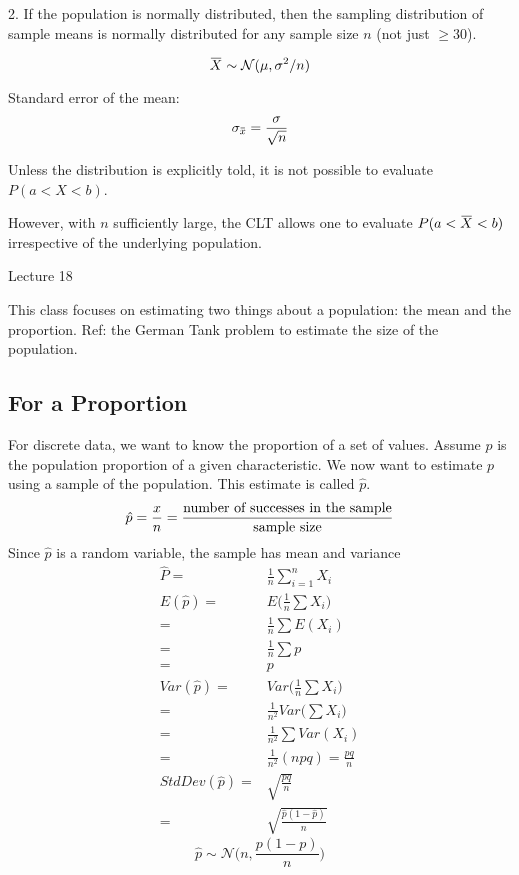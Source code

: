 \documentclass[11pt, oneside]{article}   	%
\newcommand{\overbar}[1]{\mkern 1.5mu\overline{\mkern-1.5mu#1\mkern-1.5mu}\mkern 1.5mu}
\begin{document}
2. If the population is normally distributed, then the sampling distribution of sample means is normally distributed for any sample size $n$ (not just $\geq 30$).

\[
\overbar{X} \sim \mathcal{N}(\mu, \sigma^2 / n)
\]

Standard error of the mean:
\[
\sigma_{\overbar{x}} = \frac{\sigma}{\sqrt{n}}
\]

Unless the distribution is explicitly told, it is not possible to evaluate $P(a < X < b)$.

However, with $n$ sufficiently large, the CLT allows one to evaluate $P(a < \overbar{X} < b)$ irrespective of the underlying population.

Lecture 18

This class focuses on estimating two things about a population: the mean and the proportion. Ref: the German Tank problem to estimate the size of the population.

\subsection{For a Proportion}

For discrete data, we want to know the proportion of a set of values. Assume $p$ is the population proportion of a given characteristic. We now want to estimate $p$ using a sample of the population. This estimate is called $\hat{p}$.
\[
\hat{p} = \frac{x}{n} = \frac{\text{number of successes in the sample}}{\text{sample size}}\\
\]
Since $\hat{p}$ is a random variable, the sample has mean and variance
\begin{align*}
\hat{P} =& \frac{1}{n}\sum \limits_{i=1}^{n} X_i\\
E(\hat{p}) =& E\bigg(\frac{1}{n}\sum X_i \bigg) \\
 =& \frac{1}{n}\sum E(X_i)\\
 =& \frac{1}{n}\sum p\\
 =&p \\
 Var(\hat{p}) =& Var\bigg(\frac{1}{n}\sum X_i \bigg)\\
   =& \frac{1}{n^2} Var\bigg( \sum X_i \bigg) \\
   =& \frac{1}{n^2}\sum Var(X_i) \\
   =& \frac{1}{n^2} (npq) = \frac{pq}{n}\\
 StdDev(\hat{p}) =& \sqrt{\frac{pq}{n}} \\
  =& \sqrt{\frac{\hat{p}(1-\hat{p})}{n}}  
\end{align*}
\[
\hat{p} \sim \mathcal{N} \bigg(n, \frac{p(1-p)}{n}\bigg)
\]
\end{document}

